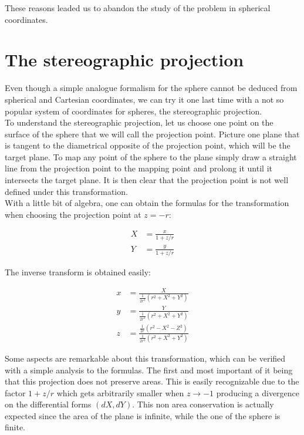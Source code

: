 These reasons leaded us to abandon the study of the problem in spherical coordinates.\\


\section{The stereographic projection}
Even though a simple analogue formalism for the sphere cannot be deduced from spherical and Cartesian coordinates, we can try it one last time with a not so popular system of coordinates for spheres, the stereographic projection.\\

To understand the stereographic projection, let us choose one point on the surface of the sphere that we will call the projection point. Picture one plane that is tangent to the diametrical opposite of the projection point, which will be the target plane. To map any point of the sphere to the plane simply draw a straight line from the projection point to the mapping point and prolong it until it intersects the target plane. It is then clear that the projection point is not well defined under this transformation.\\

With a little bit of algebra, one can obtain the formulas for the transformation when choosing the projection point at $z=-r$:

\begin{align*}
X &= \frac{x}{1+z/r}\\
Y &= \frac{y}{1+z/r}
\end{align*}

The inverse transform is obtained easily:

\begin{align*}
x &= \frac{X}{\frac{1}{2r^2}(r^2+X^2+Y^2)}\\
y &= \frac{Y}{\frac{1}{2r^2}(r^2+X^2+Y^2)}\\
z &= \frac{\frac{1}{2r}(r^2-X^2-Z^2)}{\frac{1}{2r^2}(r^2+X^2+Y^2)}
\end{align*}

Some aspects are remarkable about this transformation, which can be verified with a simple analysis to the formulas. The first and most important of it being that this projection does not preserve areas. This is easily recognizable due to the factor $1+z/r$ which gets arbitrarily smaller when $z\to -1$ producing a divergence on the differential forms $(dX,dY)$. This non area conservation is actually expected since the area of the plane is infinite, while the one of the sphere is finite.\\

